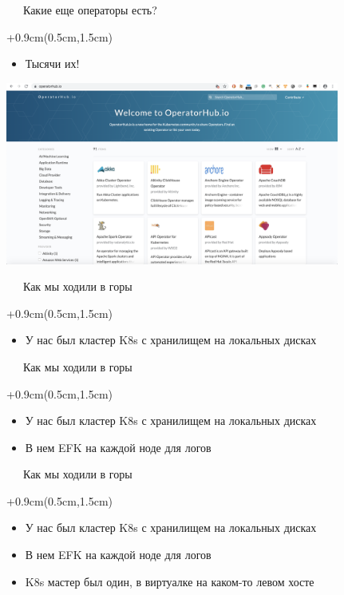 \documentclass[xetex,18pt,aspectratio=43]{beamer}
\begin{document}
\begin{Large}
\begin{frame}{\ \ \ Какие еще операторы есть?}
\begin{textblock*}{\framewidth+0.9cm}(0.5cm,1.5cm)
\begin{itemize}
  \item Тысячи их!
\end{itemize}
\begin{minipage}{\textwidth}
  \centering
  \includegraphics[height=6.0cm]{img/ophub}
\end{minipage}
\end{textblock*}
\end{frame}

\begin{frame}{\ \ \ Как мы ходили в горы}
\begin{textblock*}{\framewidth+0.9cm}(0.5cm,1.5cm)
\begin{itemize}
  \item У нас был кластер K8s с хранилищем на локальных дисках
\end{itemize}
\end{textblock*}
\end{frame}

\begin{frame}{\ \ \ Как мы ходили в горы}
\begin{textblock*}{\framewidth+0.9cm}(0.5cm,1.5cm)
\begin{itemize}
  \item У нас был кластер K8s с хранилищем на локальных дисках
  \item В нем EFK на каждой ноде для логов
\end{itemize}
\end{textblock*}
\end{frame}

\begin{frame}{\ \ \ Как мы ходили в горы}
\begin{textblock*}{\framewidth+0.9cm}(0.5cm,1.5cm)
\begin{itemize}
  \item У нас был кластер K8s с хранилищем на локальных дисках
  \item В нем EFK на каждой ноде для логов
  \item K8s мастер был один, в виртуалке на каком-то левом хосте
\end{itemize}
\end{textblock*}
\end{frame}


\end{Large}
\end{document}
